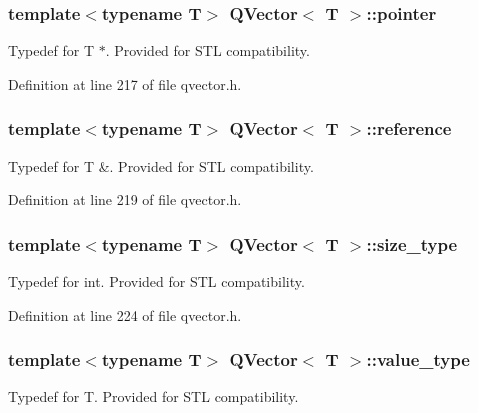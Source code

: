 \subsubsection[{\texorpdfstring{pointer}{pointer}}]{\setlength{\rightskip}{0pt plus 5cm}template$<$typename T$>$ {\bf Q\+Vector}$<$ T $>$\+::{\bf pointer}}\hypertarget{class_q_vector_ae3fa870723fe1109c22b1091d54075fa}{}\label{class_q_vector_ae3fa870723fe1109c22b1091d54075fa}
Typedef for T $\ast$. Provided for S\+TL compatibility. 

Definition at line 217 of file qvector.\+h.

\subsubsection[{\texorpdfstring{reference}{reference}}]{\setlength{\rightskip}{0pt plus 5cm}template$<$typename T$>$ {\bf Q\+Vector}$<$ T $>$\+::{\bf reference}}\hypertarget{class_q_vector_a86d1c26fb98028474e556d2e25b60633}{}\label{class_q_vector_a86d1c26fb98028474e556d2e25b60633}
Typedef for T \&. Provided for S\+TL compatibility. 

Definition at line 219 of file qvector.\+h.

\subsubsection[{\texorpdfstring{size\+\_\+type}{size_type}}]{\setlength{\rightskip}{0pt plus 5cm}template$<$typename T$>$ {\bf Q\+Vector}$<$ T $>$\+::{\bf size\+\_\+type}}\hypertarget{class_q_vector_afd8d3d4bf5a63a0c92128507dee59282}{}\label{class_q_vector_afd8d3d4bf5a63a0c92128507dee59282}
Typedef for int. Provided for S\+TL compatibility. 

Definition at line 224 of file qvector.\+h.

\subsubsection[{\texorpdfstring{value\+\_\+type}{value_type}}]{\setlength{\rightskip}{0pt plus 5cm}template$<$typename T$>$ {\bf Q\+Vector}$<$ T $>$\+::{\bf value\+\_\+type}}\hypertarget{class_q_vector_afb003dbc70603eacc89c0c7ea495dd3d}{}\label{class_q_vector_afb003dbc70603eacc89c0c7ea495dd3d}
Typedef for T. Provided for S\+TL compatibility. 

